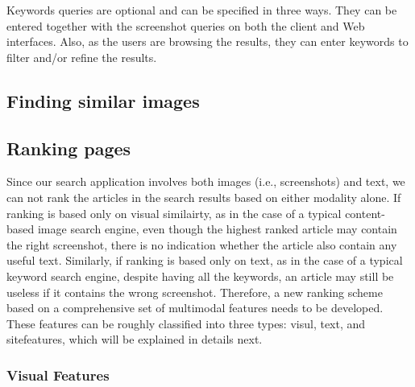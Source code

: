 \documentclass{www2010-submission}
\begin{document}
Keywords queries are optional and can be specified in three ways.
They can be entered together with the screenshot queries on both
the client and Web interfaces. Also, as the users are browsing the
results, they can enter keywords to filter and/or refine the
results.

\subsection{Finding similar images}


\subsection{Ranking pages}

Since our search application involves both images (i.e., screenshots)
and text, we can not rank the articles in the search results based on
either modality alone. If ranking is based only on visual similairty,
as in the case of a typical content-based image search engine, even
though the highest ranked article may contain the right screenshot,
there is no indication whether the article also contain any useful
text. Similarly, if ranking is based only on text, as in the case of a
typical keyword search engine, despite having all the keywords, an
article may still be useless if it contains the wrong
screenshot. Therefore, a new ranking scheme based on a comprehensive
set of multimodal features needs to be developed. These features can
be roughly classified into three types: visul, text, and sitefeatures,
which will be explained in details next.

\subsubsection{Visual Features}
\end{document}
